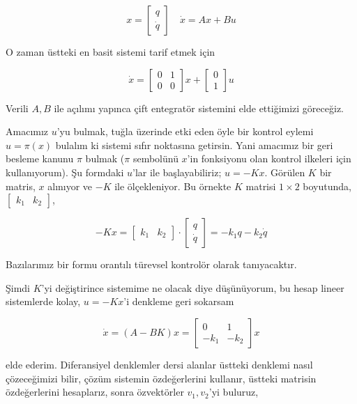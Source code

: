\documentclass[12pt,fleqn]{article}\usepackage{../../common}
\begin{document}
$$ 
x = \left[\begin{array}{c} q \\ \dot{q}  \end{array}\right] \quad
\dot{x} = A x + Bu
$$

O zaman üstteki en basit sistemi tarif etmek için

$$ 
\dot{x} = \left[\begin{array}{rr}
0 & 1 \\ 0 & 0
\end{array}\right] x + 
\left[\begin{array}{c} 0 \\ 1 \end{array}\right] u
$$

Verili $A,B$ ile açılımı yapınca çift entegratör sistemini elde ettiğimizi
göreceğiz.

Amacımız $u$'yu bulmak, tuğla üzerinde etki eden öyle bir kontrol eylemi
$u = \pi(x)$ bulalım ki sistemi sıfır noktasına getirsin. Yani amacımız bir
geri besleme kanunu $\pi$ bulmak ($\pi$ sembolünü $x$'in fonksiyonu olan
kontrol ilkeleri için kullanıyorum). Şu formdaki $u$'lar ile
başlayabiliriz; $u = -K x$. Görülen $K$ bir matris, $x$ alınıyor ve $-K$
ile ölçekleniyor. Bu örnekte $K$ matrisi $1 \times 2$ boyutunda,
$\left[\begin{array}{cc} k_1 & k_2 \end{array}\right]$,

$$ 
-K x = 
\left[\begin{array}{cc} k_1 & k_2 \end{array}\right] 
\cdot
\left[\begin{array}{cc} q \\ \dot{q} \end{array}\right] =
-k_1 q - k_2 \dot{q}
$$

Bazılarımız bir formu orantılı türevsel kontrolör olarak tanıyacaktır. 

Şimdi $K$'yi değiştirince sistemime ne olacak diye düşünüyorum, bu hesap
lineer sistemlerde kolay, $u = -Kx$'i denkleme geri sokarsam 

$$ 
\dot{x} = (A - BK)x = \left[\begin{array}{rr}
0 & 1 \\ -k_1 & -k_2
\end{array}\right] x
$$

elde ederim. Diferansiyel denklemler dersi alanlar üstteki denklemi nasıl
çözeceğimizi bilir, çözüm sistemin özdeğerlerini kullanır, üstteki matrisin
özdeğerlerini hesaplarız, sonra özvektörler $v_1,v_2$'yi buluruz,
\end{document}

